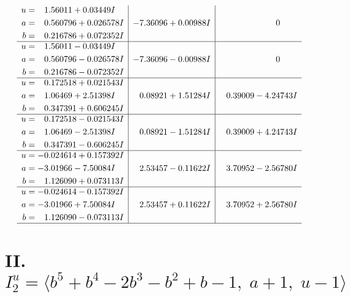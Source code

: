 \documentclass[1p]{elsarticle_modified}
\theoremstyle{definition}
\begin{document}
$$\begin{array}{c|c|c}
\begin{aligned}
u &= \phantom{-}1.56011 + 0.03449 I \\
a &= \phantom{-}0.560796 + 0.026578 I \\
b &= \phantom{-}0.216786 + 0.072352 I\end{aligned}
 & -7.36096 + 0.00988 I & \phantom{-0.000000 } 0 \\ \hline\begin{aligned}
u &= \phantom{-}1.56011 - 0.03449 I \\
a &= \phantom{-}0.560796 - 0.026578 I \\
b &= \phantom{-}0.216786 - 0.072352 I\end{aligned}
 & -7.36096 - 0.00988 I & \phantom{-0.000000 } 0 \\ \hline\begin{aligned}
u &= \phantom{-}0.172518 + 0.021543 I \\
a &= \phantom{-}1.06469 + 2.51398 I \\
b &= \phantom{-}0.347391 + 0.606245 I\end{aligned}
 & \phantom{-}0.08921 + 1.51284 I & \phantom{-}0.39009 - 4.24743 I \\ \hline\begin{aligned}
u &= \phantom{-}0.172518 - 0.021543 I \\
a &= \phantom{-}1.06469 - 2.51398 I \\
b &= \phantom{-}0.347391 - 0.606245 I\end{aligned}
 & \phantom{-}0.08921 - 1.51284 I & \phantom{-}0.39009 + 4.24743 I \\ \hline\begin{aligned}
u &= -0.024614 + 0.157392 I \\
a &= -3.01966 - 7.50084 I \\
b &= \phantom{-}1.126090 + 0.073113 I\end{aligned}
 & \phantom{-}2.53457 - 0.11622 I & \phantom{-}3.70952 - 2.56780 I \\ \hline\begin{aligned}
u &= -0.024614 - 0.157392 I \\
a &= -3.01966 + 7.50084 I \\
b &= \phantom{-}1.126090 - 0.073113 I\end{aligned}
 & \phantom{-}2.53457 + 0.11622 I & \phantom{-}3.70952 + 2.56780 I\\
 \hline 
 \end{array}$$\newpage\newpage\renewcommand{\arraystretch}{1}
\centering \section*{II. $I^u_{2}= \langle b^5+b^4-2 b^3- b^2+b-1,\;a+1,\;u-1 \rangle$}
\end{document}
